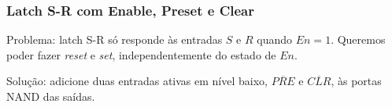 \documentclass{beamer}
\newcommand{\Not}[1]{\overline{#1}}
\begin{document}
\begin{frame}
\frametitle{Latch S-R com Enable, Preset e Clear}

Problema: latch S-R só responde às entradas
$S$ e $R$ quando $En = 1$. Queremos poder fazer
\emph{reset} e \emph{set}, independentemente do
estado de $En$.

\begin{center}
%
\end{center}

\pause

Solução: adicione duas entradas ativas em nível baixo,
$\Not{PRE}$ e $\Not{CLR}$, às portas NAND das saídas.

\end{frame}
\end{document}
